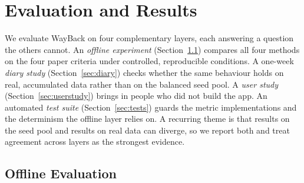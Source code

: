 \documentclass[acmlarge]{acmart}
\begin{document}
\section{Evaluation and Results}
\label{sec:evaluation}

We evaluate WayBack on four complementary layers, each answering a
question the others cannot. An \emph{offline experiment}
(Section~\ref{sec:offline}) compares all four methods on the four paper
criteria under controlled, reproducible conditions. A one-week
\emph{diary study} (Section~\ref{sec:diary}) checks whether the same
behaviour holds on real, accumulated data rather than on the balanced seed
pool. A \emph{user study} (Section~\ref{sec:userstudy}) brings in people
who did not build the app. An automated \emph{test suite}
(Section~\ref{sec:tests}) guards the metric implementations and the
determinism the offline layer relies on. A recurring theme is that results
on the seed pool and results on real data can diverge, so we report both
and treat agreement across layers as the strongest evidence.

\subsection{Offline Evaluation}
\label{sec:offline}
\end{document}
